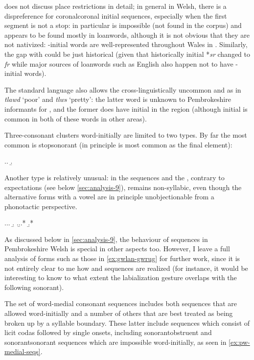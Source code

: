 \citet{awbery86:_pembr_welsh} does not discuss place restrictions in detail; in general in Welsh, there is a dispreference for coronal\endash coronal initial sequences, especially when the first segment is not a stop: \ipa{[sr]} in particular is impossible (not found in the corpus) and \ipa{[sl]} appears to be found mostly in loanwords, although it is not obvious that they are not nativized: \ipa{[sl]}\hyp initial words are well\hyp represented throughout Wales in \citet{thomas00:_welsh}. Similarly, the gap with \ipa{[sr]} could be just historical (given that historically initial *\emph{sr} changed to \emph{fr} while major sources of loanwords such as English also happen not to have \ipa{[sr]}\hyp initial words).

The standard language also allows the cross\hyp linguistically uncommon \ipa{[tl]} and \ipa{[dl]} as in \emph{tlawd} `poor' and \emph{tlws} `pretty': the latter word is unknown to Pembrokeshire informants for \citet{thomas00:_welsh}, and the former does have initial \ipa{[tl]} in the region (although initial \ipa{[kl]} is common in both of these words in other areas).

Three-consonant clusters word-initially are limited to two types. By far the most common is \ipa{[s]}\endash stop\endash sonorant (in principle \ipa{[r]} is most common as the final element):

\ex.\a.
\b.

Another type is relatively unusual: in the sequences \ipa{[ɡwl]} and \ipa{[ɡwr]} the \ipa{[w]}, contrary to expectations (see below \cref{sec:analysis-9}), remains non\hyp syllabic, even though the alternative forms with a vowel are in principle unobjectionable from a phonotactic perspective.

\ex.\a.\label{ex:gwlan-gwrug}\a.
\b.
\z.\b.\a.*\mbi{[ˈɡuːlan]}
\b.*\mbi{[ˈɡuːriɡ]}

As discussed below in \cref{sec:analysis-9}, the behaviour of \ipa{[ɡw]} sequences in Pembrokeshire Welsh is special in other aspects too. However, I leave a full analysis of forms such as those in \cref{ex:gwlan-gwrug} for further work, since it is not entirely clear to me how \ipa{[ɡwl]} and \ipa{[ɡwr]} sequences are realized (for instance, it would be interesting to know to what extent the labialization gesture overlaps with the following sonorant).

The set of word-medial consonant sequences includes both sequences that are allowed word-initially and a number of others that are best treated as being broken up by a syllable boundary. These latter include sequences which consist of licit codas followed by single onsets, including sonorant\endash obstruent and sonorant\endash sonorant sequences which are impossible word-initially, as seen in \cref{ex:pw-medial-seqs}.

